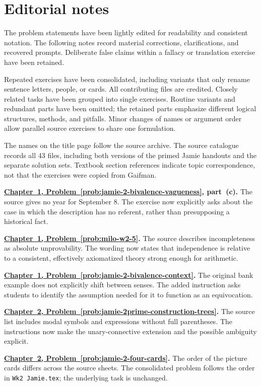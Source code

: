 \documentclass[11pt,letterpaper,oneside,openany]{book}
\newcounter{problem}[chapter]
\newcommand{\problemref}[2]{\hyperref[prob:#2]{Chapter~#1, Problem~\ref*{prob:#2}}}
\begin{document}
\chapter{Editorial notes}
The problem statements have been lightly edited for readability and consistent notation. The following notes record material corrections, clarifications, and recovered prompts. Deliberate false claims within a fallacy or translation exercise have been retained.

Repeated exercises have been consolidated, including variants that only rename sentence letters, people, or cards. All contributing files are credited. Closely related tasks have been grouped into single exercises. Routine variants and redundant parts have been omitted; the retained parts emphasize different logical structures, methods, and pitfalls. Minor changes of names or argument order allow parallel source exercises to share one formulation.

The names on the title page follow the source archive. The source catalogue records all 43 files, including both versions of the primed Jamie handouts and the separate solution sets. Textbook section references indicate topic correspondence, not that the exercises were copied from Gaifman.

\textbf{\problemref{1}{jamie-2-bivalence-vagueness}, part~(c).} The source gives no year for September 8. The exercise now explicitly asks about the case in which the description has no referent, rather than presupposing a historical fact.

\textbf{\problemref{1}{milo-w2-5}.} The source describes incompleteness as absolute unprovability. The wording now states that independence is relative to a consistent, effectively axiomatized theory strong enough for arithmetic.

\textbf{\problemref{1}{jamie-2-bivalence-context}.} The original bank example does not explicitly shift between senses. The added instruction asks students to identify the assumption needed for it to function as an equivocation.

\textbf{\problemref{2}{jamie-2prime-construction-trees}.} The source list includes modal symbols and expressions without full parentheses. The instructions now make the unary-connective extension and the possible ambiguity explicit.

\textbf{\problemref{2}{jamie-2-four-cards}.} The order of the picture cards differs across the source sheets. The consolidated problem follows the order in \texttt{Wk2 Jamie.tex}; the underlying task is unchanged.
\end{document}
